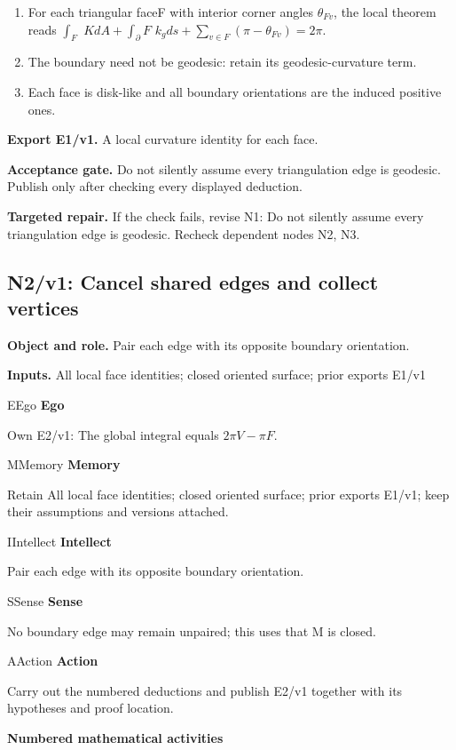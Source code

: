 \documentclass[preprint,12pt,aps,pra,showkeys,amsmath,amssymb,superscriptaddress,floatfix]{revtex4-2}
\theoremstyle{definition}
\theoremstyle{remark}
\newcommand{\mmfaculty}[3]{%
 \begin{mmfacultybox}{#1}{#2}
 {\sffamily\bfseries\color{MMBlue}#2}\par\smallskip #3
 \end{mmfacultybox}}
\newcommand{\field}[2]{\par\smallskip\noindent\textbf{#1.} #2\par}
\begin{document}
\begin{enumerate}[label=N1.\arabic*,leftmargin=3.4em]

\item For each triangular faceF with interior corner angles \(\theta _{Fv}\),
the local theorem reads \(\int _F\) \(KdA+\int _\partial F\)
\(k_gds+\sum _{v\in F}(\pi -\theta _{Fv})=2\pi\).

\item The boundary need not be geodesic: retain its geodesic-curvature term.

\item Each face is disk-like and all boundary orientations are the induced
positive ones.

\end{enumerate}

\field{Export E1/v1}{A local curvature identity for each face.}

\field{Acceptance gate}{Do not silently assume every triangulation edge is geodesic. Publish
only after checking every displayed deduction.}

\field{Targeted repair}{If the check fails, revise N1: Do not silently assume every
triangulation edge is geodesic. Recheck dependent nodes N2, N3.}

\clearpage

\subsection{N2/v1: Cancel shared edges and collect vertices}

\field{Object and role}{Pair each edge with its opposite boundary orientation.}

\field{Inputs}{All local face identities; closed oriented surface; prior exports E1/v1}

\mmfaculty{E}{Ego}{Own E2/v1: The global integral equals \(2\pi V-\pi F\).}

\mmfaculty{M}{Memory}{Retain All local face identities; closed oriented surface; prior exports
E1/v1; keep their assumptions and versions attached.}

\mmfaculty{I}{Intellect}{Pair each edge with its opposite boundary orientation.}

\mmfaculty{S}{Sense}{No boundary edge may remain unpaired; this uses that M is closed.}

\mmfaculty{A}{Action}{Carry out the numbered deductions and publish E2/v1 together with its
hypotheses and proof location.}

\smallskip\noindent\textbf{Numbered mathematical activities}
\end{document}
